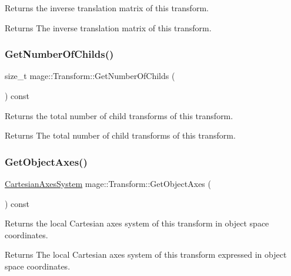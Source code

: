 Returns the inverse translation matrix of this transform.

\begin{DoxyReturn}{Returns}
The inverse translation matrix of this transform. 
\end{DoxyReturn}
\hypertarget{structmage_1_1_transform_a4661691249d08ea41f9ee44f9838f0ed}{}\label{structmage_1_1_transform_a4661691249d08ea41f9ee44f9838f0ed} 
\subsubsection{\texorpdfstring{Get\+Number\+Of\+Childs()}{GetNumberOfChilds()}}
{\footnotesize\ttfamily size\+\_\+t mage\+::\+Transform\+::\+Get\+Number\+Of\+Childs (\begin{DoxyParamCaption}{ }\end{DoxyParamCaption}) const}

Returns the total number of child transforms of this transform.

\begin{DoxyReturn}{Returns}
The total number of child transforms of this transform. 
\end{DoxyReturn}
\hypertarget{structmage_1_1_transform_a814f749d70104ec5732a741b0b2b7220}{}\label{structmage_1_1_transform_a814f749d70104ec5732a741b0b2b7220} 
\subsubsection{\texorpdfstring{Get\+Object\+Axes()}{GetObjectAxes()}}
{\footnotesize\ttfamily \hyperlink{structmage_1_1_cartesian_axes_system}{Cartesian\+Axes\+System} mage\+::\+Transform\+::\+Get\+Object\+Axes (\begin{DoxyParamCaption}{ }\end{DoxyParamCaption}) const}

Returns the local Cartesian axes system of this transform in object space coordinates.

\begin{DoxyReturn}{Returns}
The local Cartesian axes system of this transform expressed in object space coordinates. 
\end{DoxyReturn}
\hypertarget{structmage_1_1_transform_a1817e9ff4397b5a107541b92a01b91fc}{}\label{structmage_1_1_transform_a1817e9ff4397b5a107541b92a01b91fc} 
